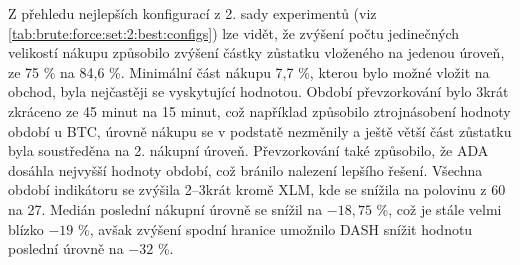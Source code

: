 \begin{table}[!htbp]
\centering
\caption[Přehled vybraných statistik z 1. sady experimentů]{~Přehled vybraných statistik z 1. sady experimentů}
\label{tab:brute:force:set:1:best:stats}
\end{table}

Z přehledu nejlepších konfigurací z 2. sady experimentů (viz \ref{tab:brute:force:set:2:best:configs}) lze vidět, že zvýšení počtu jedinečných velikostí nákupu způsobilo zvýšení částky zůstatku vloženého na jedenou úroveň, ze 75 \% na 84,6 \%.
Minimální část nákupu 7,7 \%, kterou bylo možné vložit na obchod, byla nejčastěji se vyskytující hodnotou.
Období převzorkování bylo 3krát zkráceno ze 45 minut na 15 minut, což například způsobilo ztrojnásobení hodnoty období u BTC, úrovně nákupu se v podstatě nezměnily a ještě větší část zůstatku byla soustředěna na 2. nákupní úroveň.
Převzorkování také způsobilo, že ADA dosáhla nejvyšší hodnoty období, což bránilo nalezení lepšího řešení.
Všechna období indikátoru se zvýšila 2--3krát kromě XLM, kde se snížila na polovinu z 60 na 27.
Medián poslední nákupní úrovně se snížil na \(-18,75\) \%, což je stále velmi blízko \(-19\) \%, avšak zvýšení spodní hranice umožnilo DASH snížit hodnotu poslední úrovně na \(-32\) \%.

